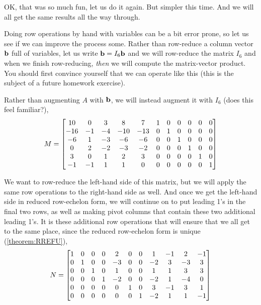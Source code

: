 \documentclass{ximera}
\begin{document}
\begin{example}[Redux]
  OK, that was so much fun, let us do it again.  But simpler this
  time.  And we will all get the same results all the way through.

  Doing row operations by hand with variables can be a bit error
  prone, so let us see if we can improve the process some.  Rather
  than row-reduce a column vector $\mathbf{b}$ full of variables, let us
  write $\mathbf{b}=I_6\mathbf{b}$ and we will row-reduce the matrix $I_6$
  and when we finish row-reducing, \textit{then} we will compute the
  matrix-vector product.  You should first convince yourself that we
  can operate like this (this is the subject of a future homework
  exercise).

  Rather than augmenting $A$ with $\mathbf{b}$, we will instead augment
  it with $I_6$ (does this feel familiar?),
  \[
    M=
    \left[\begin{array}{@{}*{11}{c}@{}}
       10 &  0 &  3 &   8 &   7 & 1 & 0 & 0 & 0 & 0 & 0 \\
      -16 & -1 & -4 & -10 & -13 & 0 & 1 & 0 & 0 & 0 & 0 \\
       -6 &  1 & -3 &  -6 &  -6 & 0 & 0 & 1 & 0 & 0 & 0 \\
        0 &  2 & -2 &  -3 &  -2 & 0 & 0 & 0 & 1 & 0 & 0 \\
        3 &  0 &  1 &   2 &   3 & 0 & 0 & 0 & 0 & 1 & 0 \\
       -1 & -1 &  1 &   1 &   0 & 0 & 0 & 0 & 0 & 0 & 1
    \end{array}\right]
  \]

  We want to row-reduce the left-hand side of this matrix, but we will
  apply the same row operations to the right-hand side as well.  And
  once we get the left-hand side in reduced row-echelon form, we will
  continue on to put leading 1's in the final two rows, as well as
  making pivot columns that contain these two additional leading 1's.
  It is these additional row operations that will ensure that we all
  get to the same place, since the reduced row-echelon form is unique
  (\ref{theorem:RREFU}),
  \[
    N=
    \left[\begin{array}{@{}*{11}{c}@{}}
      1 & 0 & 0 & 0 & 2 & 0 & 0 & 1 & -1 & 2 & -1 \\
      0 & 1 & 0 & 0 & -3 & 0 & 0 & -2 & 3 & -3 & 3 \\
      0 & 0 & 1 & 0 & 1 & 0 & 0 & 1 & 1 & 3 & 3 \\
      0 & 0 & 0 & 1 & -2 & 0 & 0 & -2 & 1 & -4 & 0 \\
      0 & 0 & 0 & 0 & 0 & 1 & 0 & 3 & -1 & 3 & 1 \\
      0 & 0 & 0 & 0 & 0 & 0 & 1 & -2 & 1 & 1 & -1
    \end{array}\right]
  \]


\end{example}
\end{document}
